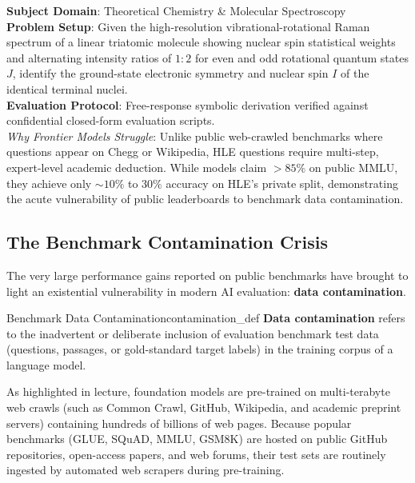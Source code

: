 \documentclass[../../main.tex]{subfiles}
\begin{document}
\begin{center}
\begin{minipage}{0.95\textwidth}
\begin{tcolorbox}[colback=cardBg,colframe=cardLine,arc=2pt,boxrule=0.5pt,title=\textbf{Humanity's Last Exam (HLE) Example: Multimodal Expert Reasoning}]
\small\sffamily
\textbf{Subject Domain}: Theoretical Chemistry \& Molecular Spectroscopy \\
\textbf{Problem Setup}: Given the high-resolution vibrational-rotational Raman spectrum of a linear triatomic molecule showing nuclear spin statistical weights and alternating intensity ratios of $1:2$ for even and odd rotational quantum states $J$, identify the ground-state electronic symmetry and nuclear spin $I$ of the identical terminal nuclei. \\
\textbf{Evaluation Protocol}: Free-response symbolic derivation verified against confidential closed-form evaluation scripts. \\
\textit{Why Frontier Models Struggle}: Unlike public web-crawled benchmarks where questions appear on Chegg or Wikipedia, HLE questions require multi-step, expert-level academic deduction. While models claim $>85\%$ on public MMLU, they achieve only $\sim 10\%$ to $30\%$ accuracy on HLE's private split, demonstrating the acute vulnerability of public leaderboards to benchmark data contamination.
\end{tcolorbox}
\end{minipage}
\end{center}

\subsection{The Benchmark Contamination Crisis}
\label{subsec:contamination_crisis}

The very large performance gains reported on public benchmarks have brought to light an existential vulnerability in modern AI evaluation: \textbf{data contamination}.

\begin{definition}{Benchmark Data Contamination}{contamination_def}
\textbf{Data contamination} refers to the inadvertent or deliberate inclusion of evaluation benchmark test data (questions, passages, or gold-standard target labels) in the training corpus of a language model.
\end{definition}

As highlighted in lecture, foundation models are pre-trained on multi-terabyte web crawls (such as Common Crawl, GitHub, Wikipedia, and academic preprint servers) containing hundreds of billions of web pages. Because popular benchmarks (GLUE, SQuAD, MMLU, GSM8K) are hosted on public GitHub repositories, open-access papers, and web forums, their test sets are routinely ingested by automated web scrapers during pre-training.
\end{document}
